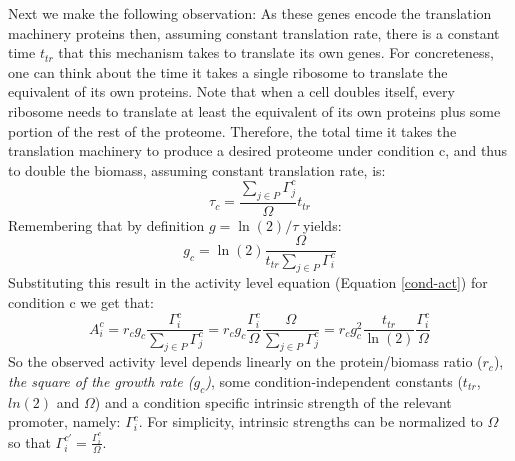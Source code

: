 \documentclass[a4page,notitlepage]{article}
\begin{document}
Next we make the following observation:
As these genes encode the translation machinery proteins then, assuming constant translation rate, there is a constant time $t_{tr}$ that this mechanism takes to translate its own genes.
For concreteness, one can think about the time it takes a single ribosome to translate the equivalent of its own proteins.
Note that when a cell doubles itself, every ribosome needs to translate at least the equivalent of its own proteins plus some portion of the rest of the proteome.
Therefore, the total time it takes the translation machinery to produce a desired proteome under condition c, and thus to double the biomass, assuming constant translation rate, is:
\[\tau_c=\frac{\sum_{j\in P}\Gamma^c_j}{\Omega}t_{tr}\]
Remembering that by  definition $g=\ln(2)/\tau$ yields:
\[g_c=\ln(2)\frac{\Omega}{t_{tr}\sum_{j\in P}\Gamma^c_i}\]
Substituting this result in the activity level equation (Equation \ref{cond-act}) for condition c we get that:
\begin{equation}
\label{ind-act}
A^c_i=r_c g_c \frac{\Gamma^c_i}{\sum_{j\in P}\Gamma^c_j}=r_c g_c \frac{\Gamma^c_i}{\Omega}\frac{\Omega}{\sum_{j\in P}\Gamma^c_j}=r_c g_c^2\frac{t_{tr}}{\ln(2)}\frac{\Gamma^c_i}{\Omega}
\end{equation}
So the observed activity level depends linearly on the protein/biomass ratio ($r_c$), \emph{the square of the growth rate ($g_c$)}, some condition-independent constants ($t_{tr}$, $ln(2)$ and $\Omega$) and a condition specific intrinsic strength of the relevant promoter, namely: ${\Gamma^c_i}$.
For simplicity, intrinsic strengths can be normalized to $\Omega$ so that $\Gamma_i^{c'} = \frac{\Gamma^c_i}{\Omega}$.
\end{document}
